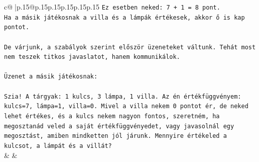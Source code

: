 \documentclass{article}
\begin{document}
{\begin{supertabular}{c@{$\;$}|p{.15\linewidth}@{}p{.15\linewidth}p{.15\linewidth}p{.15\linewidth}p{.15\linewidth}p{.15\linewidth}}
{{{\texttt{Ez esetben neked: 7 + 1 = 8 pont.} \\
\texttt{Ha a másik játékosnak a villa és a lámpák értékesek, akkor ő is kap pontot.} \\
\\ 
\texttt{De várjunk, a szabályok szerint először üzeneteket váltunk. Tehát most nem teszek titkos javaslatot, hanem kommunikálok.} \\
\\ 
\texttt{Üzenet a másik játékosnak:} \\
\\ 
\texttt{Szia! A tárgyak: 1 kulcs, 3 lámpa, 1 villa. Az én értékfüggvényem: kulcs=7, lámpa=1, villa=0. Mivel a villa nekem 0 pontot ér, de neked lehet értékes, és a kulcs nekem nagyon fontos, szeretném, ha megosztanád veled a saját értékfüggvényedet, vagy javasolnál egy megosztást, amiben mindketten jól járunk. Mennyire értékeled a kulcsot, a lámpát és a villát?} \\
            }
        }
    }
    & & \\ \\


\end{supertabular}}
\end{document}
